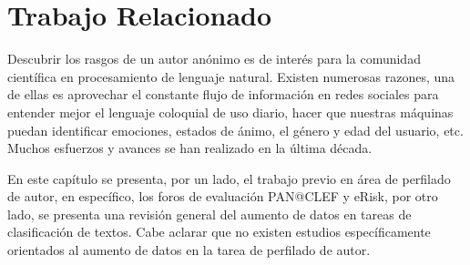 \chapter{Trabajo Relacionado}

Descubrir los rasgos de un autor anónimo es de interés para la comunidad científica en procesamiento de lenguaje natural. Existen numerosas razones, una de ellas es aprovechar el constante flujo de información en redes sociales para entender mejor el lenguaje coloquial de uso diario, hacer que nuestras máquinas puedan identificar emociones, estados de ánimo, el género y edad del usuario, etc. Muchos esfuerzos y avances se han realizado en la última década. 

En este capítulo se presenta, por un lado, el trabajo previo en área de perfilado de autor, en específico, los foros de evaluación PAN@CLEF y eRisk, por otro lado, se presenta una revisión general del aumento de datos en tareas de clasificación de textos. Cabe aclarar que no existen estudios específicamente orientados al aumento de datos en la tarea de perfilado de autor. 















